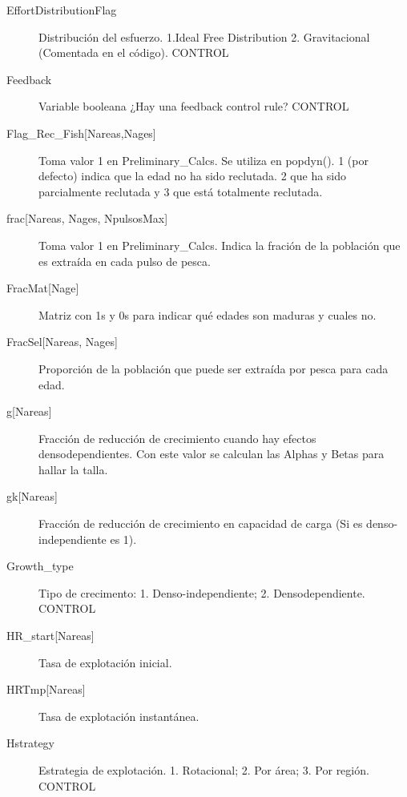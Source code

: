 \documentclass[12pt, oneside, a4paper]{article}
\begin{document}
\begin{description}
		\item[EffortDistributionFlag] Distribución del esfuerzo. 1.Ideal Free Distribution 2. Gravitacional (Comentada en el código). CONTROL
		
		\item[Feedback] Variable booleana ¿Hay una feedback control rule? CONTROL
		\item[Flag\_Rec\_Fish{[}Nareas,Nages{]}] Toma valor 1 en Preliminary\_Calcs. Se utiliza en popdyn(). 1 (por defecto) indica que la edad no ha sido reclutada. 2 que ha sido parcialmente reclutada y 3 que está totalmente reclutada.
		\item[frac{[}Nareas, Nages, NpulsosMax{]}] Toma valor 1 en Preliminary\_Calcs. Indica la fración de la población que es extraída en cada pulso de pesca.
		\item[FracMat{[}Nage{]}] Matriz con 1s y 0s para indicar qué edades son maduras y cuales no. 
		\item[FracSel{[}Nareas, Nages{]}] Proporción de la población que puede ser extraída por pesca para cada edad. 
		   
		\item[g{[}Nareas{]}] Fracción de reducción de crecimiento cuando hay efectos densodependientes. Con este valor se calculan las Alphas y Betas para hallar la talla.
		\item[gk{[}Nareas{]}] Fracción de reducción de crecimiento en capacidad de carga (Si es denso-independiente es 1).
		\item[Growth\_type] Tipo de crecimento: 1. Denso-independiente; 2. Densodependiente. CONTROL
		
		\item[HR\_start{[}Nareas{]}] Tasa de explotación inicial.
		\item[HRTmp{[}Nareas{]}] Tasa de explotación instantánea.
		\item[Hstrategy] Estrategia de explotación. 1. Rotacional; 2. Por área; 3. Por región. CONTROL
		

\end{description}
\end{document}
